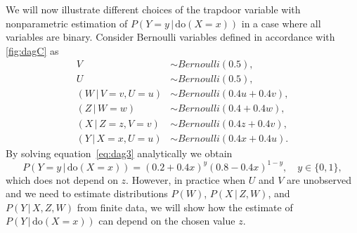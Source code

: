 \documentclass{statsoc}
\newcommand{\+}[1]{\ensuremath{\mathbf{#1}}}
\newcommand{\doo}{\textrm{do}}
\newcommand{\given}{{ \, | \, }}
\newcommand{\z}{trapdoor variable}
\begin{document}
We will now illustrate different choices of the \z{} with nonparametric estimation of $P(Y = y \given \doo(X = x))$ in a case where all variables are binary. Consider Bernoulli variables defined in accordance with \autoref{fig:dagC} as
\begin{equation}
\label{eq:bernoullidgm}
\begin{aligned}
V & \sim Bernoulli(0.5),\\
U & \sim Bernoulli(0.5),\\
(W \given V = v, U = u) & \sim Bernoulli(0.4 u + 0.4 v),\\
(Z \given W = w) & \sim Bernoulli(0.4 + 0.4 w),\\
(X \given Z = z, V = v)& \sim Bernoulli(0.4 z + 0.4 v),\\
(Y \given X = x, U = u)& \sim Bernoulli(0.4 x + 0.4 u).
\end{aligned}
\end{equation}
By solving equation~\eqref{eq:dag3} analytically we obtain
\[
P(Y = y\given \doo(X = x)) = (0.2 + 0.4 x)^y (0.8 - 0.4 x)^{1-y}, \quad y \in \{0,1\},
\]
which does not depend on $z$. However, in practice when $U$ and $V$ are unobserved and we need to estimate distributions $P(W)$, $P(X \given  Z, W)$, and $P(Y \given  X, Z, W)$ from finite data, we will show how the estimate of $P(Y\given \doo(X = x))$ can depend on the chosen value $z$.
\end{document}
